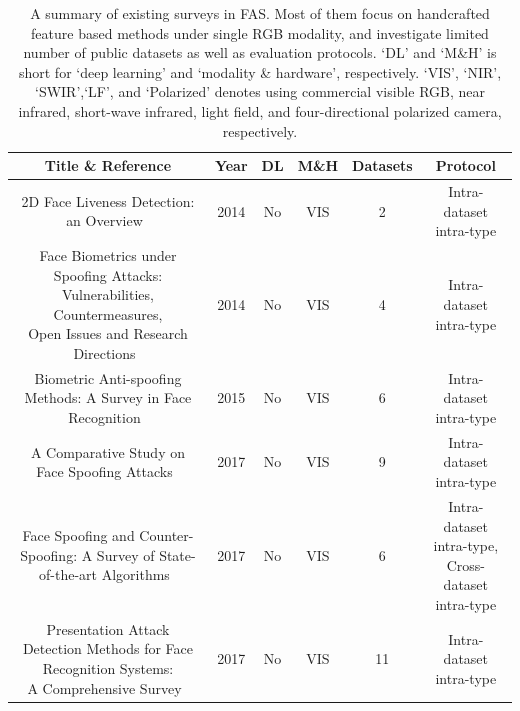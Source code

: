 \documentclass[10pt,journal,compsoc]{IEEEtran}
\begin{document}
\begin{table}
\centering
\caption{A summary of existing surveys in FAS. Most of them focus on handcrafted feature based methods under single RGB modality, and investigate limited number of public datasets as well as evaluation protocols. `DL' and `M\&H' is short for `deep learning' and `modality \& hardware', respectively. `VIS', `NIR', `SWIR',`LF', and `Polarized' denotes using commercial visible RGB, near infrared, short-wave infrared, light field, and four-directional polarized camera, respectively.} \label{tab:surveys}
\resizebox{1.0\textwidth}{!} {\begin{tabular}{c c c c c c} 
 \toprule[1pt]
 Title \& Reference & Year & DL & M\&H & Datasets & Protocol \\
 \midrule
 2D Face Liveness Detection: an Overview~\cite{kahm20122d} & 2014 & No & VIS  & 2 & Intra-dataset intra-type\\

 \midrule
 \tabincell{c}{Face Biometrics under Spoofing Attacks: Vulnerabilities, Countermeasures, \\Open Issues and Research Directions}~\cite{hadid2014face} & 2014 & No & VIS  & 4 & Intra-dataset intra-type \\

 \midrule
 Biometric Anti-spoofing Methods: A Survey in Face Recognition~\cite{galbally2014biometric} & 2015 & No & VIS  & 6 & Intra-dataset intra-type\\
 
 
 
   \midrule
A Comparative Study on Face Spoofing Attacks~\cite{kumar2017comparative} & 2017 & No & VIS  & 9 & Intra-dataset intra-type\\ 
 
  \midrule
 Face Spoofing and Counter-Spoofing: A Survey of State-of-the-art Algorithms~\cite{kisku2017face} & 2017 & No & VIS  & 6 & \tabincell{c}{Intra-dataset intra-type,\\Cross-dataset intra-type}\\ 
 
  \midrule
 \tabincell{c}{Presentation Attack Detection Methods for Face Recognition Systems: \\A Comprehensive Survey}~\cite{ramachandra2017presentation} & 2017 & No & VIS  & 11 & Intra-dataset intra-type\\ 


\end{tabular}}
\end{table}
\end{document}
